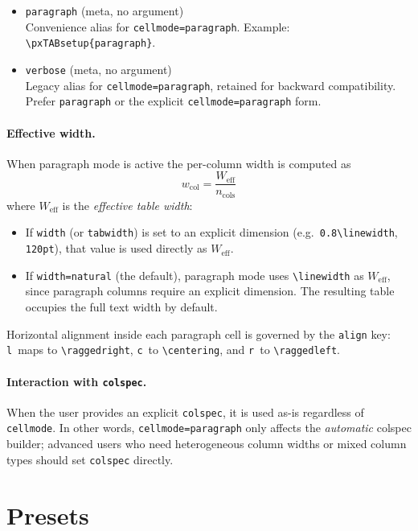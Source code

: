 \documentclass[11pt,a4paper]{article}
\begin{document}
\begin{itemize}
  \item \texttt{paragraph} (meta, no argument)\\
    Convenience alias for \texttt{cellmode=paragraph}.
    Example: \verb|\pxTABsetup{paragraph}|.

  \item \texttt{verbose} (meta, no argument)\\
    Legacy alias for \texttt{cellmode=paragraph}, retained for
    backward compatibility.  Prefer \texttt{paragraph} or the
    explicit \texttt{cellmode=paragraph} form.
\end{itemize}

\paragraph{Effective width.}
When paragraph mode is active the per-column width is computed as
\[
  w_{\text{col}} = \frac{W_{\text{eff}}}{n_{\text{cols}}}
\]
where $W_{\text{eff}}$ is the \emph{effective table width}:
\begin{itemize}
  \item If \texttt{width} (or \texttt{tabwidth}) is set to an explicit
    dimension (e.g.\ \verb|0.8\linewidth|, \texttt{120pt}), that value
    is used directly as $W_{\text{eff}}$.
  \item If \texttt{width=natural} (the default), paragraph mode uses
    \verb|\linewidth| as $W_{\text{eff}}$, since paragraph columns
    require an explicit dimension.  The resulting table occupies the
    full text width by default.
\end{itemize}
Horizontal alignment inside each paragraph cell is governed by the
\texttt{align} key: \texttt{l}~maps to \verb|\raggedright|,
\texttt{c}~to \verb|\centering|, and \texttt{r}~to \verb|\raggedleft|.

\paragraph{Interaction with \texttt{colspec}.}
When the user provides an explicit \texttt{colspec}, it is used as-is
regardless of \texttt{cellmode}.  In other words, \texttt{cellmode=paragraph}
only affects the \emph{automatic} colspec builder; advanced users who
need heterogeneous column widths or mixed column types should set
\texttt{colspec} directly.

\section{Presets}
\end{document}
